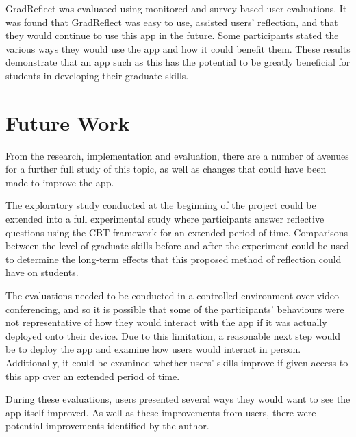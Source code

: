 \documentclass{l4proj}
\begin{document}
GradReflect was evaluated using monitored and survey-based user evaluations. It was found that GradReflect was easy to use, assisted users’ reflection, and that they would continue to use this app in the future. Some participants stated the various ways they would use the app and how it could benefit them. These results demonstrate that an app such as this has the potential to be greatly beneficial for students in developing their graduate skills.

\section{Future Work} \label{Concl_futureWork}

From the research, implementation and evaluation, there are a number of avenues for a further full study of this topic, as well as changes that could have been made to improve the app. 

The exploratory study conducted at the beginning of the project could be extended into a full experimental study where participants answer reflective questions using the CBT framework for an extended period of time. Comparisons between the level of graduate skills before and after the experiment could be used to determine the long-term effects that this proposed method of reflection could have on students. 

The evaluations needed to be conducted in a controlled environment over video conferencing, and so it is possible that some of the participants’ behaviours were not representative of how they would interact with the app if it was actually deployed onto their device. Due to this limitation, a reasonable next step would be to deploy the app and examine how users would interact in person. Additionally, it could be examined whether users’ skills improve if given access to this app over an extended period of time.

During these evaluations, users presented several ways they would want to see the app itself improved. As well as these improvements from users, there were potential improvements identified by the author.
\end{document}
